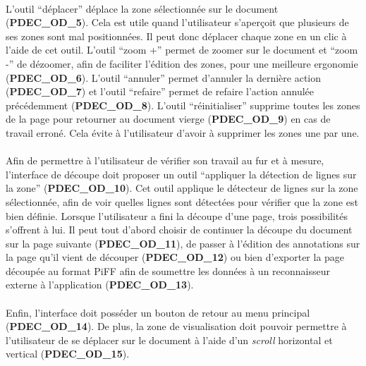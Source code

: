 \paragraph{}
L’outil “déplacer” déplace la zone sélectionnée sur le document
(\textbf{PDEC\_OD\_5}). Cela est utile quand l’utilisateur s’aperçoit que
plusieurs de ses zones sont mal positionnées. Il peut donc déplacer chaque zone
en un clic à l’aide de cet outil. L’outil “zoom +” permet de zoomer sur le
document et “zoom -” de dézoomer, afin de faciliter l’édition des zones, pour
une meilleure ergonomie (\textbf{PDEC\_OD\_6}). L’outil “annuler” permet
d’annuler la dernière action (\textbf{PDEC\_OD\_7}) et l’outil “refaire” permet
de refaire l’action annulée précédemment (\textbf{PDEC\_OD\_8}). L’outil
“réinitialiser” supprime toutes les zones de la page pour retourner au
document vierge (\textbf{PDEC\_OD\_9}) en cas de travail erroné. Cela évite à
l’utilisateur d’avoir à supprimer les zones une par une.

\paragraph{}
Afin de permettre à l’utilisateur de vérifier son travail au fur et à mesure,
l’interface de découpe doit proposer un outil “appliquer la détection de
lignes sur la zone” (\textbf{PDEC\_OD\_10}). Cet outil applique le détecteur de
lignes sur la zone sélectionnée, afin de voir quelles lignes sont détectées
pour vérifier que la zone est bien définie. Lorsque l’utilisateur a fini la
découpe d’une page, trois possibilités s’offrent à lui. Il peut tout d’abord
choisir de continuer la découpe du document sur la page suivante
(\textbf{PDEC\_OD\_11}), de passer à l’édition des annotations sur la page qu’il
vient de découper (\textbf{PDEC\_OD\_12}) ou bien d’exporter la page découpée au
format PiFF afin de soumettre les données à un reconnaisseur externe à
l’application (\textbf{PDEC\_OD\_13}).

\paragraph{}
Enfin, l’interface doit posséder un bouton de retour au menu principal
(\textbf{PDEC\_OD\_14}). De plus, la zone de visualisation doit pouvoir permettre
à l’utilisateur de se déplacer sur le document à l’aide d’un \textit{scroll} horizontal
et vertical (\textbf{PDEC\_OD\_15}).

\newpage

